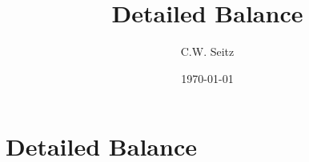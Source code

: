 \documentclass{article}
\title{Detailed Balance}
\author{C.W. Seitz}
\date{\today}
\begin{document}
\maketitle

\section{Detailed Balance}
\end{document}
